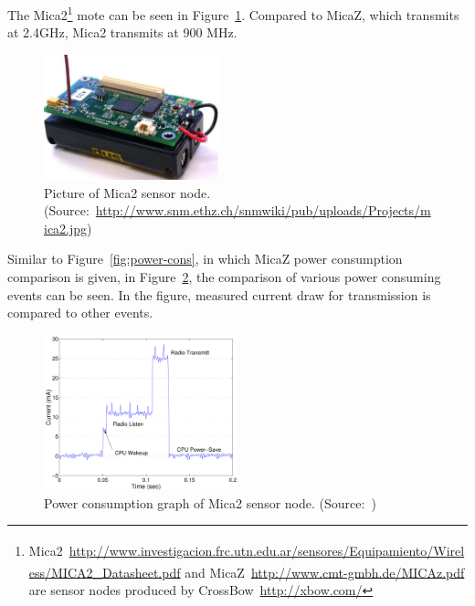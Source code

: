 \documentclass[12pt, oneandhalf, chaparabic, sees, ms]{metu}
\begin{document}
The Mica2\textsuperscript \textregistered\footnote{Mica2\textsuperscript \textregistered~\url{http://www.investigacion.frc.utn.edu.ar/sensores/Equipamiento/Wireless/MICA2_Datasheet.pdf} and MicaZ\textsuperscript \textregistered~\url{http://www.cmt-gmbh.de/MICAz.pdf} are sensor nodes produced by CrossBow~\url{http://xbow.com/}} 
mote can be seen in Figure~\ref{fig:mica2}. Compared to MicaZ\textsuperscript \textregistered, which transmits at 2.4GHz, Mica2 transmits at 900 MHz.
% 
%
%
\begin{figure}[!htbp]
 \begin{center}
  \includegraphics[width=0.45\textwidth]{mica2.jpg}
 \end{center}
 \caption{Picture of Mica2 sensor node. (Source:~\protect\url{http://www.snm.ethz.ch/snmwiki/pub/uploads/Projects/mica2.jpg})}
  \label{fig:mica2}
\end{figure}
% 
%
% 
Similar to Figure~\ref{fig:power-cons}, in which MicaZ power consumption comparison is given, in Figure~\ref{fig:mica2-power-cons}, 
the comparison of various power consuming events can be seen. In the figure, measured current draw for transmission is compared to other events.
% 
%
%
\begin{figure}[!htbp]
 \begin{center}
  \includegraphics[width=0.5\textwidth]{mica2-power-graph.png}
 \end{center}
 \caption{Power consumption graph of Mica2 sensor node. (Source:~\cite{shnayder2004}\protect\footnotemark)}
  \label{fig:mica2-power-cons}
\end{figure}
% 
%
%
\end{document}
